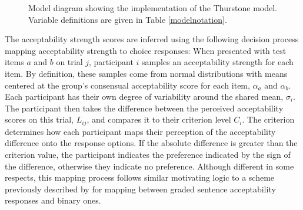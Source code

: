 \documentclass[doc]{apa6}
\newcommand{\thurstone}{{\sc Thurstone}}
\begin{document}
\begin{figure}
\centering
{}
\caption{Model diagram showing the implementation of the \thurstone{} model. Variable definitions are given in Table \ref{modelnotation}. }
\label{modeldiagram}
\end{figure}

The acceptability strength scores are inferred using the following decision process mapping acceptability strength to choice responses:
When presented with test items $a$ and $b$ on trial $j$, participant $i$ samples an acceptability strength for each item. By definition, these samples come from normal distributions with means centered at the group's consensual acceptability score for each item, $\alpha_a$ and $\alpha_b$. Each participant has their own degree of variability around the shared mean, $\sigma_i$. The participant then takes the difference between the perceived acceptability scores on this trial, $L_{ij}$, and compares it to their criterion level $C_i$. The criterion determines how each participant maps their perception of the acceptability difference onto the response options. If the absolute difference is greater than the criterion value, the participant indicates the preference indicated by the sign of the difference, otherwise they indicate no preference. Although different in some respects, this mapping process follows similar motivating logic to a scheme previously described by \citet{bader2010sigdetection}
for mapping between graded sentence acceptability responses and binary ones.
\end{document}
